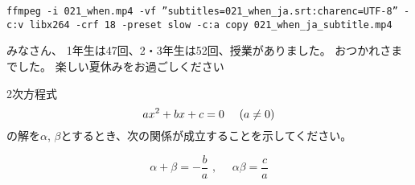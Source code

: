 \documentclass[12pt,jafontscale=0.9247]{jlreq}
\begin{document}
\begin{verbatim}
ffmpeg -i 021_when.mp4 -vf ”subtitles=021_when_ja.srt:charenc=UTF-8” -c:v libx264 -crf 18 -preset slow -c:a copy 021_when_ja_subtitle.mp4
\end{verbatim}

\newpage
\vfill

{\gtfamily\bfseries

みなさん、
1年生は47回、2・3年生は52回、授業がありました。
おつかれさまでした。
楽しい夏休みをお過ごしください
}

%


2次方程式
\[
 ax^2+bx+c=0\,\,\,\,\,\,\,\,\text(a\neq{}0\text)
\]
の解を$\alpha$, $\beta$とするとき、次の関係が成立することを示してください。

\begin{tcolorbox}
 \[
 \alpha + \beta = -\frac{b}{a}\,\,,\,\,\,\,\,\,\,\,\alpha\beta = \frac{c}{a}
\]

\end{tcolorbox}
\end{document}
